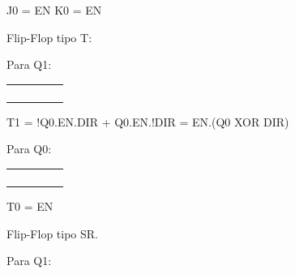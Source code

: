 {J0 = EN}
{K0 = EN}

{Flip-Flop tipo T:}

{Para Q1:}

\begin{center}
\tablehead{}
\begin{supertabular}{|m{0.675cm}|m{0.772cm}|m{0.772cm}|m{0.772cm}|m{0.825cm}|}
\hline&
 &  &  & \centering{}\\\hline
{} &  &  &  & \centering{}\\\hline
{} &  &  &  & \centering{}\\\hline
{} &  &  &  & \centering{}\\\hline
{} &  &  &  & \centering{}\\\hline
\end{supertabular}
\end{center}

{T1 = !Q0.EN.DIR + Q0.EN.!DIR = EN.(Q0 XOR DIR)}

{Para Q0:}

\begin{center}
\tablehead{}
\begin{supertabular}{|m{0.675cm}|m{0.772cm}|m{0.772cm}|m{0.772cm}|m{0.825cm}|}
\hline &
 &  &  & \centering{}\\\hline
{} &  &  &  & \centering{}\\\hline
{} &  &  &  & \centering{}\\\hline
{} &  &  &  & \centering{}\\\hline
{} &  &  &  & \centering{}\\\hline
\end{supertabular}
\end{center}

{T0 = EN}

{Flip-Flop tipo SR.}

{Para Q1:}

